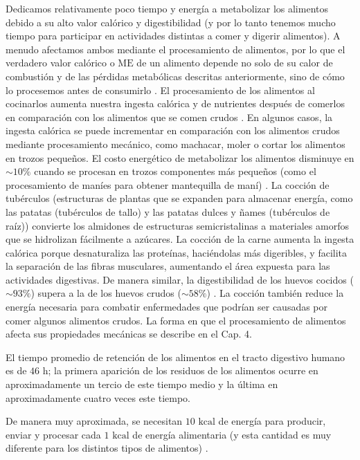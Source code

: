 \documentclass[12pt]{book}
\begin{document}
Dedicamos relativamente poco tiempo y energía a metabolizar los alimentos debido a su alto valor calórico y digestibilidad (y por lo tanto tenemos mucho tiempo para participar en actividades distintas a comer y digerir alimentos). A menudo afectamos ambos mediante el procesamiento de alimentos, por lo que el verdadero valor calórico o $\text{ME}$ de un alimento depende no solo de su calor de combustión y de las pérdidas metabólicas descritas anteriormente, sino de cómo lo procesemos antes de consumirlo \cite{100}. El procesamiento de los alimentos al cocinarlos aumenta nuestra ingesta calórica y de nutrientes después de comerlos en comparación con los alimentos que se comen crudos \cite{14,21,56}. En algunos casos, la ingesta calórica se puede incrementar en comparación con los alimentos crudos mediante procesamiento mecánico, como machacar, moler o cortar los alimentos en trozos pequeños. El costo energético de metabolizar los alimentos disminuye en $\sim 10\%$ cuando se procesan en trozos componentes más pequeños (como el procesamiento de maníes para obtener mantequilla de maní) \cite{14,56}. La cocción de tubérculos (estructuras de plantas que se expanden para almacenar energía, como las patatas (tubérculos de tallo) y las patatas dulces y ñames (tubérculos de raíz)) convierte los almidones de estructuras semicristalinas a materiales amorfos que se hidrolizan fácilmente a azúcares. La cocción de la carne aumenta la ingesta calórica porque desnaturaliza las proteínas, haciéndolas más digeribles, y facilita la separación de las fibras musculares, aumentando el área expuesta para las actividades digestivas. De manera similar, la digestibilidad de los huevos cocidos ($\sim 93\%$) supera a la de los huevos crudos ($\sim 58\%$) \cite{31,32}. La cocción también reduce la energía necesaria para combatir enfermedades que podrían ser causadas por comer algunos alimentos crudos. La forma en que el procesamiento de alimentos afecta sus propiedades mecánicas se describe en el Cap. 4.

El tiempo promedio de retención de los alimentos en el tracto digestivo humano es de $46\text{ h}$; la primera aparición de los residuos de los alimentos ocurre en aproximadamente un tercio de este tiempo medio y la última en aproximadamente cuatro veces este tiempo.

De manera muy aproximada, se necesitan $10\text{ kcal}$ de energía para producir, enviar y procesar cada $1\text{ kcal}$ de energía alimentaria (y esta cantidad es muy diferente para los distintos tipos de alimentos) \cite{56,80}.
\end{document}
